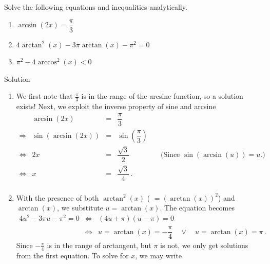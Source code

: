 \begin{example}  Solve the following equations and inequalities analytically. 

\begin{enumerate}

\item  $\arcsin(2x) = \dfrac{\pi}{3}$

\item  $4\arctan^2(x)-3\pi \arctan(x)-\pi^2 = 0$


\item  $\pi^2-4\arccos^{2}(x) < 0$

\end{enumerate}

Solution 

\begin{enumerate}

\item  We first note that $\frac{\pi}{3}$ is in the range of the arcsine function,  so a solution exists! Next, we exploit the inverse property of sine and arcsine
\renewcommand{\arraystretch}{2}%
\[ \begin{array}{rrclr}

&\arcsin(2x) & = & \dfrac{\pi}{3} & \\
\Rightarrow&\sin\left(\arcsin(2x)\right) & = & \sin\left(\dfrac{\pi}{3}\right) & \\ [2pt]
\Leftrightarrow&2x & = & \dfrac{\sqrt{3}}{2} & \quad\text{(Since $\sin(\arcsin(u)) = u$.)} \\ [2pt]
\Leftrightarrow&x & = & \dfrac{\sqrt{3}}{4}\,. & \\ \end{array} \]
\renewcommand{\arraystretch}{1}%

\item  With the presence of both $\arctan^{2}(x)$ ( $= (\arctan(x))^2$) and $\arctan(x)$, we substitute $u = \arctan(x)$.  The equation becomes 
$$
\begin{array}{rcl}
	4u^2 -3\pi u - \pi^2 = 0&\Leftrightarrow& (4u+\pi)(u - \pi) = 0\\[0.2cm]
	&\Leftrightarrow& u = \arctan(x) = -\dfrac{\pi}{4}\quad\vee\quad u = \arctan(x) = \pi\,.
	\end{array}$$ 
 Since $-\frac{\pi}{4}$ is in the range of arctangent, but $\pi$ is not, we only get solutions from the first equation.  To solve for $x$, we may write
\renewcommand{\arraystretch}{1.5}%
\[ \begin{array}{rrclr}


\end{array}\]
\end{enumerate}
\end{example}
